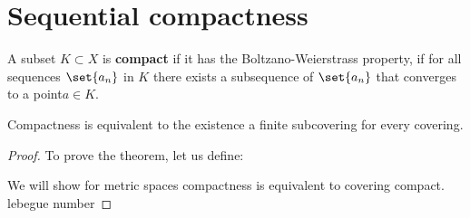 \newpage
\section{Sequential compactness}

A subset \(K \subset X\) is \textbf{compact} if it has the Boltzano-Weierstrass property, if for all sequences \(\set{a_n}\) in \(K\) there exists a subsequence of \(\set{a_n}\) that converges to a point\(a \in K\).

\begin{theorem}
    Compactness is equivalent to the existence a finite subcovering for every covering.
\end{theorem}
\begin{proof}
    To prove the theorem, let us define:

    We will show for metric spaces compactness is equivalent to covering compact.
    lebegue number
\end{proof}





